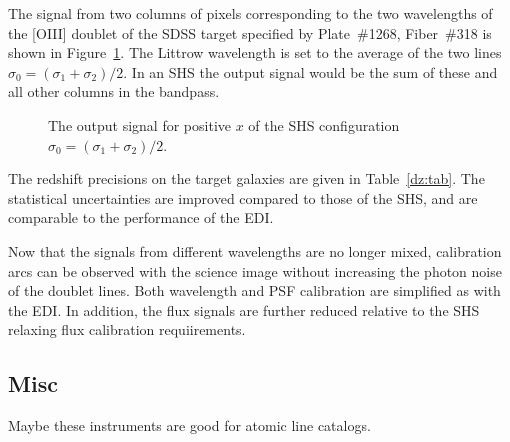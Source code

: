 \documentclass[preprint]{aastex}
\begin{document}
The signal from two columns of pixels corresponding to the two wavelengths of
the [OIII] doublet of the
SDSS target specified by Plate~\#1268, Fiber~\#318 is shown in Figure~\ref{edshs:fig}.
The Littrow wavelength is set to the average of the two lines  $\sigma_0=(\sigma_1+\sigma_2)/2$.
In an SHS the output signal would be the sum of these and all other columns in the bandpass.

\begin{figure}[t]
   \centering
   \caption{The output signal for positive $x$ of the  SHS configuration
    $\sigma_0=(\sigma_1+\sigma_2)/2$. \label{edshs:fig}}
\end{figure}

The redshift precisions on the target galaxies are given in Table~\ref{dz:tab}.  The statistical uncertainties are improved compared to those of the
SHS, and are comparable to the performance of the EDI.

Now that the signals from different wavelengths are no longer mixed, calibration arcs can be observed with the science image without increasing
the photon noise of the doublet lines.  Both wavelength and PSF calibration are simplified as with the EDI.
In addition, the flux signals are further reduced relative to the SHS relaxing flux calibration requiirements.

\subsection{Misc}
Maybe these instruments are good for atomic line catalogs.



\end{document}
